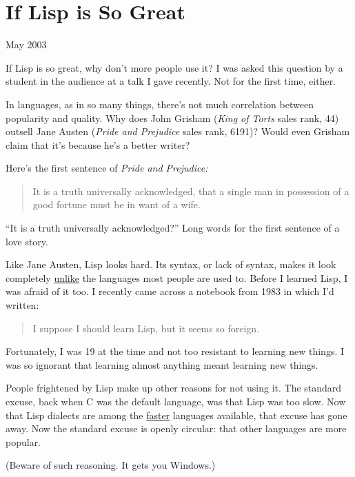 \chapter{If Lisp is So Great}

May 2003

If Lisp is so great, why don't more people use it? I was asked this
question by a student in the audience at a talk I gave recently. Not for
the first time, either.

In languages, as in so many things, there's not much correlation between
popularity and quality. Why does John Grisham (\emph{King of Torts}
sales rank, 44) outsell Jane Austen (\emph{Pride and Prejudice} sales
rank, 6191)? Would even Grisham claim that it's because he's a better
writer?

Here's the first sentence of \emph{Pride and Prejudice:}

\begin{quote}
It is a truth universally acknowledged, that a single man in possession
of a good fortune must be in want of a wife.
\end{quote}

``It is a truth universally acknowledged?'' Long words for the first
sentence of a love story.

Like Jane Austen, Lisp looks hard. Its syntax, or lack of syntax, makes
it look completely
\href{https://sep.turbifycdn.com/ty/cdn/paulgraham/acl2.lisp?t=1688221954&}{unlike}
the languages most people are used to. Before I learned Lisp, I was
afraid of it too. I recently came across a notebook from 1983 in which
I'd written:

\begin{quote}
I suppose I should learn Lisp, but it seems so foreign.
\end{quote}

Fortunately, I was 19 at the time and not too resistant to learning new
things. I was so ignorant that learning almost anything meant learning
new things.

People frightened by Lisp make up other reasons for not using it. The
standard excuse, back when C was the default language, was that Lisp was
too slow. Now that Lisp dialects are among the
\href{http://shootout.alioth.debian.org/benchmark.php?test=nestedloop&lang=all&sort=cpu}{faster}
languages available, that excuse has gone away. Now the standard excuse
is openly circular: that other languages are more popular.

(Beware of such reasoning. It gets you Windows.)

